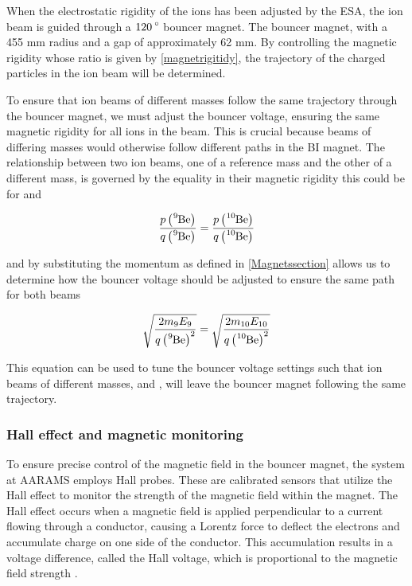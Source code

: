 When the electrostatic rigidity of the ions has been adjusted by the ESA, the ion beam is guided through a $\ce{120^{\circ}}$ bouncer magnet. The bouncer magnet, with a 455 mm radius and a gap of approximately 62 mm. By controlling the magnetic rigidity whose ratio is given by \cref{magnetrigitidy}, the trajectory of the charged particles in the ion beam will be determined.

To ensure that ion beams of different masses follow the same trajectory through the bouncer magnet, we must adjust the bouncer voltage, ensuring the same magnetic rigidity for all ions in the beam. This is crucial because beams of differing masses would otherwise follow different paths in the BI magnet. The relationship between two ion beams, one of a reference mass and the other of a different mass, is governed by the equality in their magnetic rigidity this could be for  and 

\begin{equation*}
    \dfrac{p\left(\ce{^{9}Be}\right)}{q\left(\ce{^{9}Be}\right)}=\dfrac{p\left(\ce{^{10}Be}\right)}{q\left(\ce{^{10}Be}\right)}
\end{equation*}

and by substituting the momentum as defined in \cref{Magnetssection} allows us to determine how the bouncer voltage should be adjusted to ensure the same path for both beams

\begin{equation}
    \sqrt{\dfrac{2m_{9}E_{9}}{q\left(\ce{^{9}Be}\right)^{2}}}=    \sqrt{\dfrac{2m_{10}E_{10}}{q\left(\ce{^{10}Be}\right)^{2}}}
\end{equation}

This equation can be used to tune the bouncer voltage settings such that ion beams of different masses, and , will leave the bouncer magnet following the same trajectory.

\subsubsection{Hall effect and magnetic monitoring}
To ensure precise control of the magnetic field in the bouncer magnet, the system at AARAMS employs Hall probes. These are calibrated sensors that utilize the Hall effect to monitor the strength of the magnetic field within the magnet. The Hall effect occurs when a magnetic field is applied perpendicular to a current flowing through a conductor, causing a Lorentz force to deflect the electrons and accumulate charge on one side of the conductor. This accumulation results in a voltage difference, called the Hall voltage, which is proportional to the magnetic field strength \cite{wiki:hall_effect_sensor, electronics:tutorial_hall_effect}.

